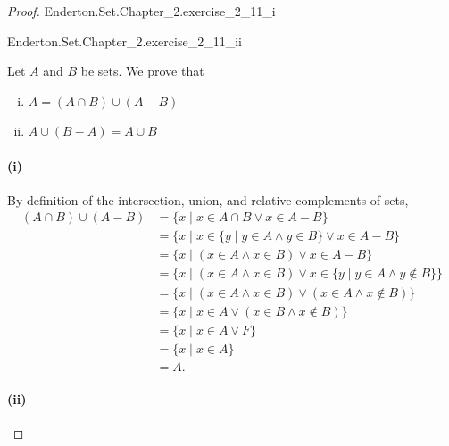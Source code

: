\documentclass{report}
\begin{document}
\begin{proof}

  \statementpadding

    {Enderton.Set.Chapter\_2.exercise\_2\_11\_i}

    {Enderton.Set.Chapter\_2.exercise\_2\_11\_ii}

  \noindent Let $A$ and $B$ be sets.
  We prove that
    \begin{enumerate}[(i)]
      \item $A = (A \cap B) \cup (A - B)$
      \item $A \cup (B - A) = A \cup B$
    \end{enumerate}

  \paragraph{(i)}%

    By definition of the intersection, union, and relative complements of sets,
      \begin{align*}
        (A \cap B) \cup (A - B)
          & = \{ x \mid x \in A \cap B \lor x \in A - B \} \\
          & = \{ x \mid x \in \{ y \mid y \in A \land y \in B \} \lor
            x \in A - B \} \\
          & = \{ x \mid (x \in A \land x \in B) \lor x \in A - B \} \\
          & = \{ x \mid (x \in A \land x \in B) \lor
            x \in \{ y \mid y \in A \land y \not\in B \} \} \\
          & = \{ x \mid (x \in A \land x \in B) \lor
            (x \in A \land x \not\in B) \} \\
          & = \{ x \mid x \in A \lor (x \in B \land x \not\in B) \} \\
          & = \{ x \mid x \in A \lor F \} \\
          & = \{ x \mid x \in A \} \\
          & = A.
      \end{align*}

  \paragraph{(ii)}%


\end{proof}
\end{document}
